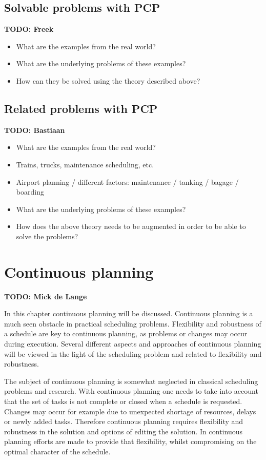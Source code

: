 \documentclass{article}
\newcommand{\TODO}[1]{{\color{red}\textbf{TODO: #1}}}
\begin{document}
\subsection{Solvable problems with PCP}
\TODO{Freek}
\begin{itemize}
\item What are the examples from the real world? 
\item What are the underlying problems of these examples?
\item How can they be solved using the theory described above?
\end{itemize}

\subsection{Related problems with PCP}
\TODO{Bastiaan}
\begin{itemize}
\item What are the examples from the real world?
\item Trains, trucks, maintenance scheduling, etc.
\item Airport planning / different factors: maintenance / tanking / bagage / boarding
\item What are the underlying problems of these examples?
\item How does the above theory needs to be augmented in order to be able to solve the problems?
\end{itemize}


\section{Continuous planning} \TODO{Mick de Lange}

In this chapter continuous planning will be discussed.
Continuous planning is a much seen obstacle in practical scheduling problems.
Flexibility and robustness of a schedule are key to continuous planning, as problems or changes may occur during execution.
Several different aspects and approaches of continuous planning will be viewed in the light of the scheduling problem and related to flexibility and robustness.

The subject of continuous planning is somewhat neglected in classical scheduling problems and research.
With continuous planning one needs to take into account that the set of tasks is not complete or closed when a schedule is requested.
Changes may occur for example due to unexpected shortage of resources, delays or newly added tasks.
Therefore continuous planning requires flexibility and robustness in the solution and options of editing the solution.
In continuous planning efforts are made to provide that flexibility, whilst compromising on the optimal character of the schedule.
\end{document}

